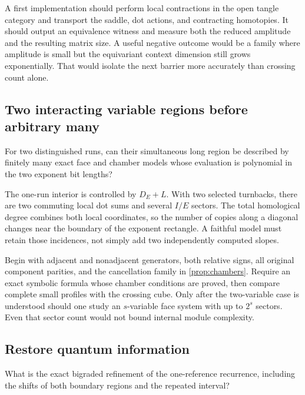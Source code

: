 A first implementation should perform local contractions in the open
tangle category and transport the saddle, dot actions, and contracting
homotopies. It should output an equivalence witness and measure both
the reduced amplitude and the resulting matrix size.
A useful negative outcome would be a family where amplitude is small
but the equivariant context dimension still grows exponentially.
That would isolate the next barrier more accurately than crossing
count alone.

\subsection{Two interacting variable regions before arbitrary many}

\begin{question}\label{q:two}
For two distinguished runs, can their simultaneous long region be
described by finitely many exact face and chamber models whose evaluation
is polynomial in the two exponent bit lengths?
\end{question}

The one-run interior is controlled by \(D_E+L\). With two selected
turnbacks, there are two commuting local dot sums and several
\(I/E\) sectors. The total homological degree combines both local
coordinates, so the number of copies along a diagonal changes near
the boundary of the exponent rectangle. A faithful model must retain
those incidences, not simply add two independently computed slopes.

Begin with adjacent and nonadjacent generators, both relative signs,
all original component parities, and the cancellation family in
\cref{prop:chambers}. Require an exact symbolic formula whose chamber
conditions are proved, then compare complete small profiles with the
crossing cube. Only after the two-variable case is understood should
one study an \(s\)-variable face system with up to \(2^s\) sectors.
Even that sector count would not bound internal module complexity.

\subsection{Restore quantum information}

\begin{question}\label{q:quantum}
What is the exact bigraded refinement of the one-reference recurrence,
including the shifts of both boundary regions and the repeated interval?
\end{question}

